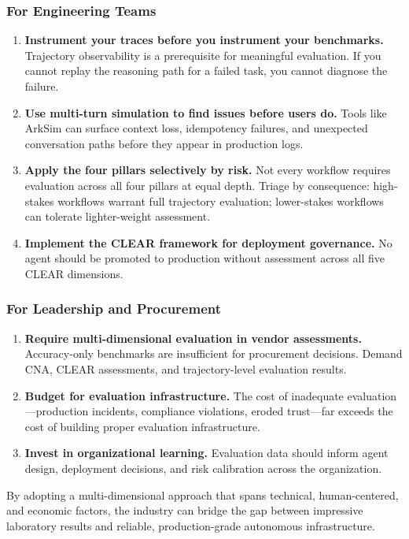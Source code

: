 \subsubsection{For Engineering Teams}

\begin{enumerate}
    \item \textbf{Instrument your traces before you instrument your benchmarks.} Trajectory observability is a prerequisite for meaningful evaluation. If you cannot replay the reasoning path for a failed task, you cannot diagnose the failure.
    \item \textbf{Use multi-turn simulation to find issues before users do.} Tools like ArkSim can surface context loss, idempotency failures, and unexpected conversation paths before they appear in production logs.
    \item \textbf{Apply the four pillars selectively by risk.} Not every workflow requires evaluation across all four pillars at equal depth. Triage by consequence: high-stakes workflows warrant full trajectory evaluation; lower-stakes workflows can tolerate lighter-weight assessment.
    \item \textbf{Implement the CLEAR framework for deployment governance.} No agent should be promoted to production without assessment across all five CLEAR dimensions.
\end{enumerate}

\subsubsection{For Leadership and Procurement}

\begin{enumerate}
    \item \textbf{Require multi-dimensional evaluation in vendor assessments.} Accuracy-only benchmarks are insufficient for procurement decisions. Demand CNA, CLEAR assessments, and trajectory-level evaluation results.
    \item \textbf{Budget for evaluation infrastructure.} The cost of inadequate evaluation---production incidents, compliance violations, eroded trust---far exceeds the cost of building proper evaluation infrastructure.
    \item \textbf{Invest in organizational learning.} Evaluation data should inform agent design, deployment decisions, and risk calibration across the organization.
\end{enumerate}

\vspace{1cm}
\noindent By adopting a multi-dimensional approach that spans technical, human-centered, and economic factors, the industry can bridge the gap between impressive laboratory results and reliable, production-grade autonomous infrastructure.

